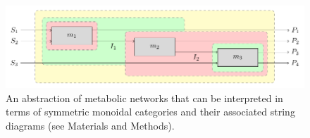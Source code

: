 \begin{figure}
\begin{center}
\noindent\includegraphics[width=0.9\columnwidth]{fig/blockdiagtop.pdf}
\end{center}
\caption{An abstraction of metabolic networks that can be interpreted in terms of symmetric monoidal categories and their associated string diagrams (see Materials and Methods).}
\label{fig:metabolicstringdiag}
\end{figure}